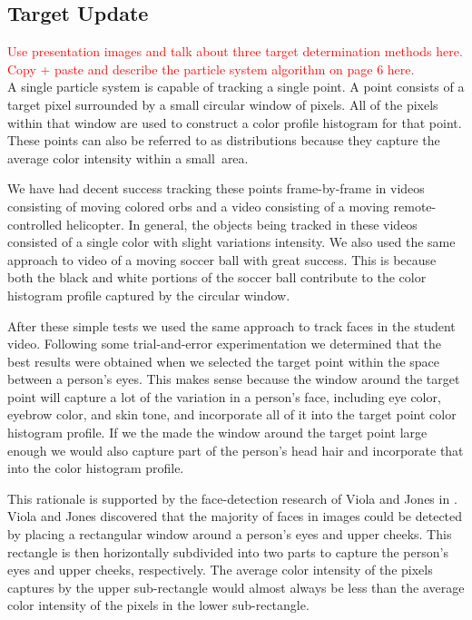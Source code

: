 \documentclass[11pt]{article}
\begin{document}
\subsection{Target Update}

\textcolor{red}{Use presentation images and talk about three target determination methods here.} \\



\textcolor{red}{Copy + paste and describe the particle system algorithm on page 6 here.} \\


A single particle system is capable of tracking a single point. A point consists of a target pixel surrounded by a small circular window of pixels. All of the pixels within that window are used to construct a color profile histogram for that point. These points can also be referred to as distributions because they capture the average color intensity within a small~area.

We have had decent success tracking these points frame-by-frame in videos consisting of moving colored orbs and a video consisting of a moving remote-controlled helicopter. In general, the objects being tracked in these videos consisted of a single color with slight variations intensity. We also used the same approach to video of a moving soccer ball with great success. This is because both the black and white portions of the soccer ball contribute to the color histogram profile captured by the circular window.

After these simple tests we used the same approach to track faces in the student video. Following some trial-and-error experimentation we determined that the best results were obtained when we selected the target point within the space between a person's eyes. This makes sense because the window around the target point will capture a lot of the variation in a person's face, including eye color, eyebrow color, and skin tone, and incorporate all of it into the target point color histogram profile. If we the made the window around the target point large enough we would also capture part of the person's head hair and incorporate that into the color histogram profile. 

This rationale is supported by the face-detection research of Viola and Jones in \cite{facedetection}. Viola and Jones discovered that the majority of faces in images could be detected by placing a rectangular window around a person's eyes and upper cheeks. This rectangle is then horizontally subdivided into two parts to capture the person's eyes and upper cheeks, respectively. The average color intensity of the pixels captures by the upper sub-rectangle would almost always be less than the average color intensity of the pixels in the lower sub-rectangle.  
\end{document}
